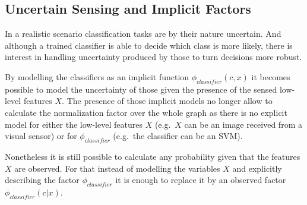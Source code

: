 \subsection{Uncertain Sensing and Implicit Factors}
\label{sec:cues-from-low-level}
In a realistic scenario classification tasks are by their nature uncertain.
And although a trained classifier is able to decide which class is more likely, there is
interest in handling uncertainty produced by those to turn decisions more robust.

By modelling the classifiers as an implicit function $\phi_{classifier}(c, x)$ it becomes
possible to model the uncertainty of those given the presence of the sensed low-level
features $X$. The presence of those implicit models no longer allow to calculate the
normalization factor over the whole graph as there is no explicit model for either the
low\hyp{}level features $X$ (e.g.\ $X$ can be an image received from a visual sensor)
or for $\phi_{classifier}$ (e.g.\ the classifier can be an \gls{SVM}).

Nonetheless it is still possible to calculate any probability given that the features $X$
are observed. For that instead of modelling the variables $X$ and explicitly describing
the factor $\phi_{classifier}$ it is enough to replace it by an observed factor $\phi_{classifier}(c|x)$.


